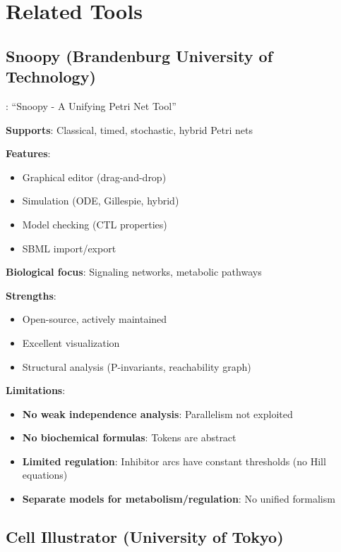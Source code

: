 \section{Related Tools}
\label{sec:related-tools}

\subsection{Snoopy (Brandenburg University of Technology)}
\label{subsec:snoopy}

\textbf{\citet{Heiner2012}}: ``Snoopy - A Unifying Petri Net Tool''

\textbf{Supports}: Classical, timed, stochastic, hybrid Petri nets

\textbf{Features}:

\begin{itemize}
    \item Graphical editor (drag-and-drop)
    \item Simulation (ODE, Gillespie, hybrid)
    \item Model checking (CTL properties)
    \item SBML import/export
\end{itemize}

\textbf{Biological focus}: Signaling networks, metabolic pathways

\textbf{Strengths}:

\begin{itemize}
    \item Open-source, actively maintained
    \item Excellent visualization
    \item Structural analysis (P-invariants, reachability graph)
\end{itemize}

\textbf{Limitations}:

\begin{itemize}
    \item \textbf{No weak independence analysis}: Parallelism not exploited
    \item \textbf{No biochemical formulas}: Tokens are abstract
    \item \textbf{Limited regulation}: Inhibitor arcs have constant thresholds (no Hill equations)
    \item \textbf{Separate models for metabolism/regulation}: No unified formalism
\end{itemize}

\subsection{Cell Illustrator (University of Tokyo)}
\label{subsec:cell-illustrator}

